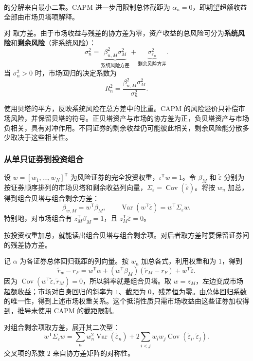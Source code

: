 的分解来自最小二乘。CAPM 进一步用限制总体截距为 $\alpha_n=0$，即期望超额收益全部由市场贝塔项解释。

\begin{tcolorbox}[knowledge]
对 取方差。由于市场收益与残差的协方差为零，资产收益的总风险可分为\textbf{系统风险}和\textbf{剩余风险}（非系统风险）：
\begin{equation*}
 \sigma_n^2=\underbrace{\beta_{n,M}^2\sigma_M^2}_{\text{系统风险方差}}
 +\underbrace{\sigma_{\varepsilon_n}^2}_{\text{剩余风险方差}}.
 \tag{13.I}\label{eq:wj-13-market-variance}
\end{equation*}
当 $\sigma_n^2>0$ 时，市场回归的决定系数为
\[
 R_n^2=\frac{\beta_{n,M}^2\sigma_M^2}{\sigma_n^2}.
\]
\end{tcolorbox}

使用贝塔的平方，反映系统风险在总方差中的比重。CAPM 的风险溢价只补偿市场风险，并保留贝塔的符号。正贝塔资产与市场的协方差为正，负贝塔资产与市场负相关，具有对冲作用。不同证券的剩余收益仍可能彼此相关，剩余风险能分散多少取决于这些相关性。

\subsubsection{从单只证券到投资组合}
设 $w=[w_1,\ldots,w_N]^{\mathsf T}$ 为风险证券的完全投资权重，$\iota^{\mathsf T}w=1$。令 $\beta_M$ 和 $\widetilde\varepsilon$ 分别为按证券顺序排列的市场贝塔和剩余收益列向量，$\Sigma_\varepsilon=\operatorname{Cov}(\widetilde\varepsilon)$。将按 $w_n$ 加总，得到组合贝塔与组合剩余方差：
\[
 \beta_{w,M}=w^{\mathsf T}\beta_M,\qquad
 \operatorname{Var}(w^{\mathsf T}\widetilde\varepsilon)=w^{\mathsf T}\Sigma_\varepsilon w.
\]
特别地，对市场组合有 $z_M^{\mathsf T}\beta_M=1$，且 $z_M^{\mathsf T}\widetilde\varepsilon=0$。

按投资权重加总，就能读出组合贝塔与组合剩余项。对后者取方差时要保留证券间的残差协方差。

\begin{solution}[label-content={证明（组合的市场贝塔与剩余风险）},blank-type=none]
记 $\alpha$ 为各证券总体回归截距的列向量。按 $w_n$ 加总各式，利用权重和为 $1$，得到
\[
 \widetilde r_w-r_F
 =w^{\mathsf T}\alpha+(w^{\mathsf T}\beta_M)(\widetilde r_M-r_F)
  +w^{\mathsf T}\widetilde\varepsilon.
\]
因为 $\operatorname{Cov}(w^{\mathsf T}\widetilde\varepsilon,\widetilde r_M)=0$，所以斜率就是组合贝塔。取 $w=z_M$，左边变成市场超额收益；市场对自身回归的斜率为 $1$、截距为 $0$，残差恒为零。由总体回归系数的唯一性，得到上述市场权重关系。这个抵消性质只需市场收益由这些证券加权得到，推导未使用 CAPM 的截距限制。

对组合剩余项取方差，展开其二次型：
\[
 w^{\mathsf T}\Sigma_\varepsilon w
 =\sum_n w_n^2\operatorname{Var}(\widetilde\varepsilon_n)
  +2\sum_{i<j} w_iw_j\operatorname{Cov}(\widetilde\varepsilon_i,\widetilde\varepsilon_j).
\]
交叉项的系数 $2$ 来自协方差矩阵的对称性。
\end{solution}

